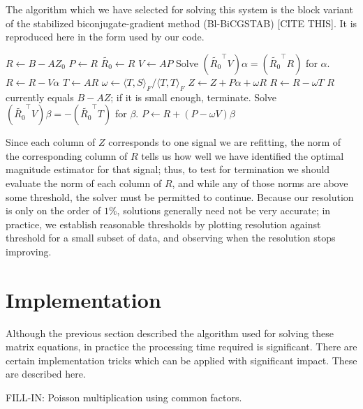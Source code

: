 The algorithm which we have selected for solving this system is the block variant of the stabilized biconjugate-gradient method (Bl-BiCGSTAB) [CITE THIS].  It is reproduced here in the form used by our code.

\begin{algorithmic}
\STATE $R \gets B-AZ_0$
\STATE $P \gets R$
\STATE $\widetilde{R_0} \gets R$
  \STATE $V \gets AP$
  \STATE Solve $(\widetilde{R_0}^\top V)\alpha = (\widetilde{R_0}^\top R)$ for $\alpha$.
  \STATE $R \gets R - V\alpha$
  \STATE $T \gets AR$
  \STATE $\omega \gets {\langle T,S\rangle_F} / {\langle T,T\rangle_F} $
  \STATE $Z \gets Z + P\alpha + \omega R$
  \STATE $R \gets R - \omega T$
  \STATE $R$ currently equals $B-AZ$; if it is small enough, terminate.
  \STATE Solve $(\widetilde{R_0}^\top V)\beta = -(\widetilde{R_0}^\top T)$ for $\beta$.
  \STATE $P \gets R + (P - \omega V) \beta$
\ENDWHILE

\end{algorithmic}

Since each column of $Z$ corresponds to one signal we are refitting, the norm of the corresponding column of $R$ tells us how well we have identified the optimal magnitude estimator for that signal; thus, to test for termination we should evaluate the norm of each column of $R$, and while any of those norms are above some threshold, the solver must be permitted to continue.  Because our resolution is only on the order of $1\%$, solutions generally need not be very accurate; in practice, we establish reasonable thresholds by plotting resolution against threshold for a small subset of data, and observing when the resolution stops improving.

\section{Implementation}

Although the previous section described the algorithm used for solving these matrix equations, in practice the processing time required is significant.  There are certain implementation tricks which can be applied with significant impact.  These are described here.

FILL-IN: Poisson multiplication using common factors.

